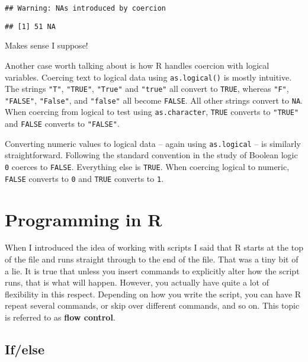 \documentclass[]{book}
\begin{document}
\begin{verbatim}
## Warning: NAs introduced by coercion
\end{verbatim}

\begin{verbatim}
## [1] 51 NA
\end{verbatim}

Makes sense I suppose!

Another case worth talking about is how R handles coercion with logical variables. Coercing text to logical data using \texttt{as.logical()} is mostly intuitive. The strings \texttt{"T"}, \texttt{"TRUE"}, \texttt{"True"} and \texttt{"true"} all convert to \texttt{TRUE}, whereas \texttt{"F"}, \texttt{"FALSE"}, \texttt{"False"}, and \texttt{"false"} all become \texttt{FALSE}. All other strings convert to \texttt{NA}. When coercing from logical to test using \texttt{as.character}, \texttt{TRUE} converts to \texttt{"TRUE"} and \texttt{FALSE} converts to \texttt{"FALSE"}.

Converting numeric values to logical data -- again using \texttt{as.logical} -- is similarly straightforward. Following the standard convention in the study of Boolean logic \texttt{0} coerces to \texttt{FALSE}. Everything else is \texttt{TRUE}. When coercing logical to numeric, \texttt{FALSE} converts to \texttt{0} and \texttt{TRUE} converts to \texttt{1}.

\hypertarget{programming}{%
\chapter{Programming in R}\label{programming}}

When I introduced the idea of working with scripts I said that R starts at the top of the file and runs straight through to the end of the file. That was a tiny bit of a lie. It is true that unless you insert commands to explicitly alter how the script runs, that is what will happen. However, you actually have quite a lot of flexibility in this respect. Depending on how you write the script, you can have R repeat several commands, or skip over different commands, and so on. This topic is referred to as \textbf{flow control}.

\hypertarget{ifelse}{%
\section{If/else}\label{ifelse}}
\end{document}
